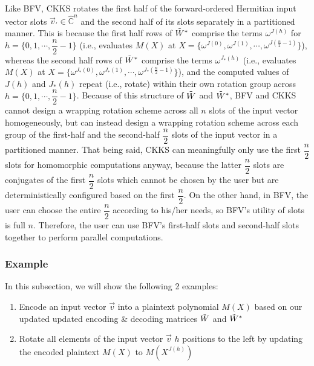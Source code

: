  Like BFV, CKKS rotates the first half of the forward-ordered Hermitian input vector slots $\vec{v}_{'} \in \mathbb{\hat{C}}^n$ and the second half of its slots separately in a partitioned manner. This is because the first half rows of $\tilde{W}^*$ comprise the terms $\omega^{J(h)}$ for $h = \{0, 1, \cdots, \dfrac{n}{2} - 1\}$ (i.e., evaluates $M(X)$ at $X=\{\omega^{J(0)}, \omega^{J(1)}, \cdots, \omega^{J(\frac{n}{2}-1)}\}$), whereas the second half rows of $\tilde{W}^*$ comprise the terms $\omega^{J_*(h)}$ (i.e., evaluates $M(X)$ at $X=\{\omega^{J_*(0)}, \omega^{J_*(1)}, \cdots, \omega^{J_*(\frac{n}{2}-1)}\}$), and the computed values of $J(h)$ and $J_*(h)$ repeat (i.e., rotate) within their own rotation group across $h=\{0, 1, \cdots, \dfrac{n}{2} - 1\}$. Because of this structure of $\tilde W$ and $\tilde W^*$, BFV and CKKS cannot design a wrapping rotation scheme across all $n$ slots of the input vector homogeneously, but can instead design a wrapping rotation scheme across each group of the first-half and the second-half $\dfrac{n}{2}$ slots of the input vector in a partitioned manner. That being said, CKKS can meaningfully only use the first $\dfrac{n}{2}$ slots for homomorphic computations anyway, because the latter $\dfrac{n}{2}$ slots are conjugates of the first $\dfrac{n}{2}$ slots which cannot be chosen by the user but are deterministically configured based on the first $\dfrac{n}{2}$. On the other hand, in BFV, the user can choose the entire $\dfrac{n}{2}$ according to his/her needs, so BFV's utility of slots is full $n$. Therefore, the user can use BFV's first-half slots and second-half slots together to perform parallel computations. 




\subsubsection{Example}
\label{subsubsec:ckks-rotation-ex}

In this subsection, we will show the following 2 examples:
\begin{enumerate}
\item Encode an input vector $\vec{v}$ into a plaintext polynomial $M(X)$ based on our updated updated encoding \& decoding matrices $\tilde W$ and $\tilde W^*$
\item Rotate all elements of the input vector $\vec{v}$ $h$ positions to the left by updating the encoded plaintext $M(X)$ to $M(X^{J(h)})$
\end{enumerate}

